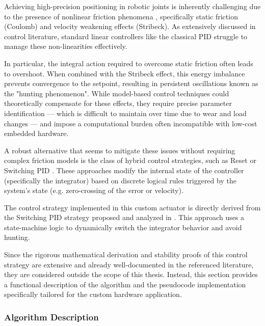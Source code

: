 Achieving high-precision positioning in robotic joints is inherently challenging due to the presence of
nonlinear friction phenomena \cite{armstrong1994survey}, specifically static friction (Coulomb) and velocity
weakening effects (Stribeck). As extensively discussed in control literature, standard linear controllers like
the classical PID struggle to manage these non-linearities effectively.

In particular, the integral action required to overcome static friction often leads to overshoot. When
combined with the Stribeck effect, this energy imbalance prevents convergence to the setpoint, resulting in
persistent oscillations known as the "hunting phenomenon". While model-based control techniques could
theoretically compensate for these effects, they require precise parameter identification — which is difficult
to maintain over time due to wear and load changes — and impose a computational burden often incompatible with
low-cost embedded hardware.

A robust alternative that seems to mitigate these issues without requiring complex friction models is the
class of hybrid control strategies, such as Reset or Switching PID \cite{bisoffi2020stick, lorigiola2025switching}.
These approaches modify the internal state of the controller (specifically the integrator) based on discrete
logical rules triggered by the system's state (e.g. zero-crossing of the error or velocity).

The control strategy implemented in this custom actuator is directly derived from the Switching PID strategy
proposed and analyzed in \cite{lorigiola2025switching}. This approach uses a state-machine logic to
dynamically switch the integrator behavior and avoid hunting.

Since the rigorous mathematical derivation and stability proofs of this control strategy are extensive and already
well-documented in the referenced literature, they are considered outside the scope of this thesis. Instead,
this section provides a functional description of the algorithm and the pseudocode implementation specifically
tailored for the custom hardware application.


\subsubsection{Algorithm Description}

